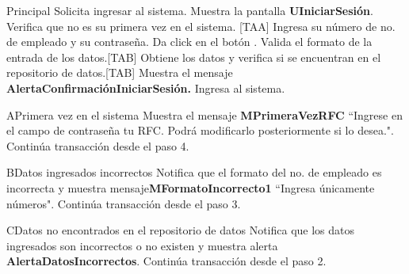 \begin{UCtrayectoria}{Principal}
  \UCpaso[\UCactor] Solicita ingresar al sistema.
  \UCpaso Muestra la pantalla {\bf UIniciarSesión}.
  \UCpaso[\UCactor] Verifica que no es su primera vez en el sistema. [TAA]
  \UCpaso[\UCactor] Ingresa su número de no. de empleado y su contraseña.
  \UCpaso[\UCactor]Da click en el botón .
  \UCpaso Valida el formato de la entrada de los datos.[TAB]
  \UCpaso Obtiene los datos y verifica si se encuentran en el repositorio de datos.[TAB]
  \UCpaso Muestra el mensaje {\bf AlertaConfirmaciónIniciarSesión. }
  \UCpaso[\UCactor]Ingresa al sistema.
\end{UCtrayectoria}

\begin{UCtrayectoriaA}{A}{Primera vez en el sistema}
  \UCpaso Muestra el mensaje {\bf MPrimeraVezRFC} ``Ingrese en el campo de contraseña tu RFC.
Podrá modificarlo posteriormente si lo desea.".
  \UCpaso Continúa transacción desde el paso 4.
\end{UCtrayectoriaA}

\begin{UCtrayectoriaA}{B}{Datos ingresados incorrectos}
  \UCpaso Notifica que el formato del no. de empleado es incorrecta y muestra mensaje{\bf MFormatoIncorrecto1} ``Ingresa únicamente números".
  \UCpaso Continúa transacción desde el paso 3.
\end{UCtrayectoriaA}

\begin{UCtrayectoriaA}{C}{Datos no encontrados en el repositorio de datos}
  \UCpaso Notifica que los datos ingresados son incorrectos o no existen y muestra alerta {\bf AlertaDatosIncorrectos}.
  \UCpaso Continúa transacción desde el paso 2.
\end{UCtrayectoriaA}

